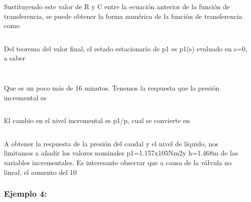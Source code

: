 \documentclass[a4paper,12pt,twoside]{proyectotanquesecci}
\begin{document}
\begin{equation}
\end{equation}

Sustituyendo este valor de R y C entre la ecuación anterior de la función de transferencia, se puede obtener la forma numérica  de la función de transferencia como \\

\begin{equation}
\end{equation}


\begin{equation}
\end{equation}

Del teorema del valor final, el estado estacionario de p1 es p1(s) evaluado en s=0, a saber

\begin{equation}
\end{equation}


\begin{equation}
\end{equation}

Que es un poco más de 16 minutos. Tenemos la respuesta que la  presión incremental es


\begin{equation}
\end{equation}

El cambio en el nivel incremental es p1/p, cual se convierte en 

\begin{equation}
\end{equation}

A obtener la respuesta de la presión del caudal y el nivel de líquido, nos limitamos a añadir los valores nominales p1=1.157x105Nm2y h=1.468m  de las variables incrementales. Es interesante observar que a causa de la válvula no lineal, el aumento del 10%

\subsubsection{Ejemplo 4:}
\end{document}
